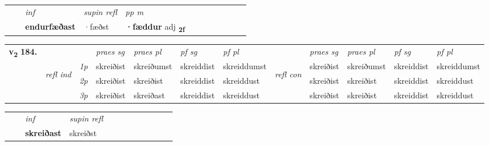 \begin{tabular}{llllllllllll}
 & & \textit{inf}       & \textit{supin refl} & \textit{pp m}     \\*
  & & \textbf{endurfæðast}        & ·fæðst & \textbf{·fæddur} adj \textbf{\textsubscript{2f}} \\*
\cmidrule{1-12}
\end{tabular}



\begin{tabular}{llllllllllll} \toprule
\multirow{4}{*}{{{\textbf{v{\textsubscript{2}}} \Large{\textbf{184.}}}}}  & &   &  \textit{praes sg}  & \textit{praes pl}  &\textit{pf sg} & \textit{pf pl} &  &  \textit{praes sg}  & \textit{praes pl}  & \textit{pf sg} & \textit{pf pl } \\*
	\cmidrule{4-7} \cmidrule{9-12}
 &\multirow{3}{*}{\begin{turn}{90}\textit{refl ind}\end{turn}} & {\textit{1p}} & skreiðist & skreiðumst    & skreiddist & skreiddumst & \multirow{3}{*}{\begin{turn}{90}\textit{refl con}\end{turn}}  &skreiðist & skreiðumst & skreiddist & skreiddumst\\*
 &&  {\textit{2p}} &  skreiðist  & skreiðist   & skreiddist & skreiddust & &skreiðist & skreiðist & skreiddist & skreiddust \\*
& &  {\textit{3p}} & skreiðist & skreiðast   & skreiddist & skreiddust & & skreiðist & skreiðist& skreiddist & skreiddust  \\*
\cmidrule{4-7} \cmidrule{9-12}
\end{tabular}


\begin{tabular}{llllllllllll}
 & & \textit{inf}       & \textit{supin refl}      \\*
  & & \textbf{skreiðast}        & skreiðst  \\*
\cmidrule{1-12}
\end{tabular}



